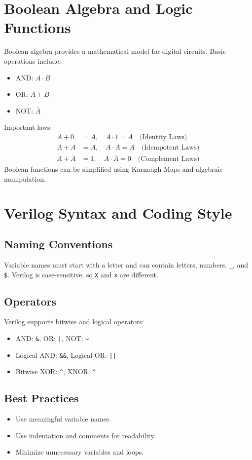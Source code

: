\documentclass[twocolumn]{article}
\begin{document}
\section{Boolean Algebra and Logic Functions}
Boolean algebra provides a mathematical model for digital circuits. Basic operations include:
\begin{itemize}
    \item AND: \( A \cdot B \)
    \item OR: \( A + B \)
    \item NOT: \( \overline{A} \)
\end{itemize}

Important laws:
\begin{align}
    A + 0 &= A, \quad A \cdot 1 = A \quad \text{(Identity Laws)} \\
    A + A &= A, \quad A \cdot A = A \quad \text{(Idempotent Laws)} \\
    A + \overline{A} &= 1, \quad A \cdot \overline{A} = 0 \quad \text{(Complement Laws)}
\end{align}
Boolean functions can be simplified using Karnaugh Maps and algebraic manipulation.

\section{Verilog Syntax and Coding Style}
\subsection{Naming Conventions}
Variable names must start with a letter and can contain letters, numbers, \texttt{\_}, and \texttt{\$}. Verilog is case-sensitive, so \texttt{X} and \texttt{x} are different.

\subsection{Operators}
Verilog supports bitwise and logical operators:
\begin{itemize}
    \item AND: \texttt{\&}, OR: \texttt{|}, NOT: \texttt{\textasciitilde}
    \item Logical AND: \texttt{\&\&}, Logical OR: \texttt{||}
    \item Bitwise XOR: \texttt{\^}, XNOR: \texttt{\^{}~}
\end{itemize}

\subsection{Best Practices}
\begin{itemize}
    \item Use meaningful variable names.
    \item Use indentation and comments for readability.
    \item Minimize unnecessary variables and loops.
\end{itemize}
\end{document}
